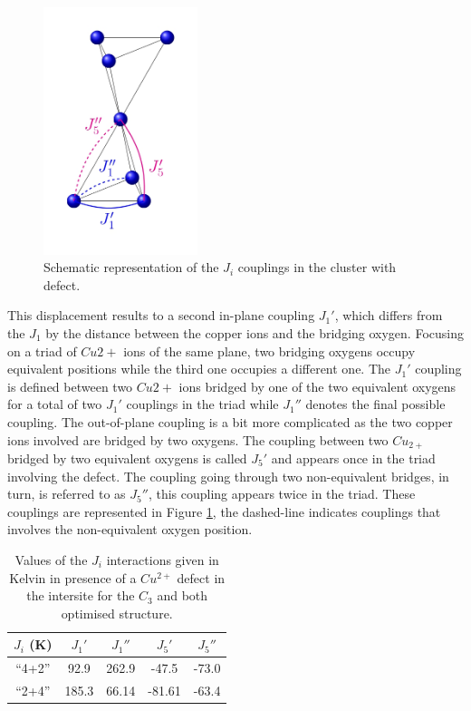 \documentclass[12pt]{report}
\numberwithin{equation}{section}
\begin{document}
\begin{figure}[!ht]
    \centering
    \includegraphics[width=0.4\textwidth]{Images/CouplageInterplan.jpg}
    \caption[]{Schematic representation of the $J_i$ couplings in the cluster with defect.}
    \label{fig:CouplageInterplan}
\end{figure}


This displacement results to a second in-plane coupling $J_1'$, which differs from the $J_1$ by the distance between the copper ions and the bridging oxygen.
Focusing on a triad of $Cu{2+}$ ions of the same plane, two bridging oxygens occupy equivalent positions while the third one occupies a different one.
The $J_1'$ coupling is defined between two $Cu{2+}$ ions bridged by one of the two equivalent oxygens for a total of two $J_1'$ couplings in the triad while $J_1''$ denotes the final possible coupling.
The out-of-plane coupling is a bit more complicated as the two copper ions involved are bridged by two oxygens.
The coupling between two $Cu_{2+}$ bridged by two equivalent oxygens is called $J_5'$ and appears once in the triad involving the defect.
The coupling going through two non-equivalent bridges, in turn, is referred to as $J_5''$, this coupling appears twice in the triad.
These couplings are represented in Figure \ref{fig:CouplageInterplan}, the dashed-line indicates couplings that involves the non-equivalent oxygen position.


\begin{table}[!ht]
    \centering
    \begin{tabular}{c c c c c }
        \hline
        $J_i$ (K) & $J_1'$ & $J_1''$ & $J_5'$ & $J_5''$\\
        \hline
        ``4+2'' & 92.9 & 262.9 & -47.5 & -73.0\\
        ``2+4'' & 185.3 & 66.14 & -81.61 & -63.4\\
        \hline
    \end{tabular}
    \caption{Values of the $J_i$ interactions given in Kelvin in presence of a $Cu^{2+}$ defect in the intersite for the $C_3$ and both optimised structure.}
    \label{tab:DefautJ}
\end{table}
\end{document}
